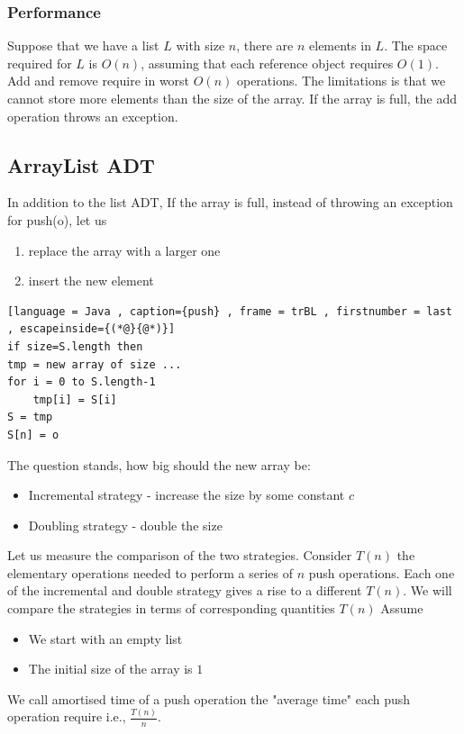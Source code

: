 \documentclass[a4paper]{article}
\theoremstyle{plain}
\theoremstyle{definition}
\theoremstyle{remark}
\begin{document}
\subsubsection{Performance}
Suppose that we have a list $L$ with size $n$, there are $n$ elements in $L$. The space required for $L$ is $O(n)$, assuming that each reference object requires $O(1)$. Add and remove require in worst $O(n)$ operations. The limitations is that we cannot store more elements than the size of the array. If the array is full, the add operation throws an exception.
\subsection{ArrayList ADT}
In addition to the list ADT,
If the array is full, instead of throwing an exception for push(o), let us
\begin{enumerate}
	\item replace the array with a larger one
	\item insert the new element
\end{enumerate}
\begin{lstlisting}[language = Java , caption={push} , frame = trBL , firstnumber = last , escapeinside={(*@}{@*)}]
if size=S.length then
tmp = new array of size ...
for i = 0 to S.length-1
	tmp[i] = S[i]
S = tmp
S[n] = o
\end{lstlisting}
The question stands, how big should the new array be:
\begin{itemize}
	\item Incremental strategy - increase the size by some constant $c$ 
	\item Doubling strategy - double the size
\end{itemize}
Let us measure the comparison of the two strategies. Consider $T(n)$ the elementary operations needed to perform a series of $n$ push operations. Each one of the incremental and double strategy gives a rise to a different $T(n)$. We will compare the strategies in terms of corresponding quantities $T(n)$ Assume
\begin{itemize}
	\item We start with an empty list
	\item The initial size of the array is $1$
\end{itemize}
We call amortised time of a push operation the "average time" each push operation require i.e., $\frac{T(n)}{n}$.
\end{document}
